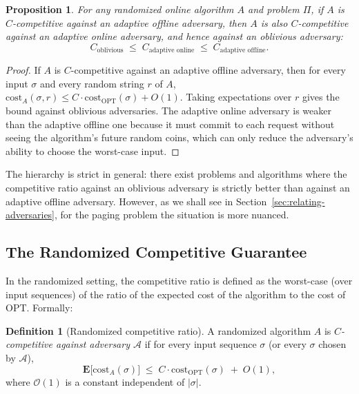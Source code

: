 \documentclass[twoside,12pt]{book}
\theoremstyle{plain}
\newtheorem{proposition}[theorem]{Proposition}
\theoremstyle{definition}
\newtheorem{definition}[theorem]{Definition}
\theoremstyle{remark}
\begin{document}
\begin{proposition}\label{prop:adversary-hierarchy}
For any randomized online algorithm $A$ and problem $\Pi$, if $A$ is
$C$-competitive against an adaptive offline adversary, then $A$ is also
$C$-competitive against an adaptive online adversary, and hence against an
oblivious adversary:
\[
  C_{\text{oblivious}} \;\le\; C_{\text{adaptive online}} \;\le\; C_{\text{adaptive offline}}.
\]
\end{proposition}

\begin{proof}
If $A$ is $C$-competitive against an adaptive offline adversary, then for
every input $\sigma$ and every random string $r$ of $A$,
$\mathrm{cost}_A(\sigma, r) \le C \cdot \mathrm{cost}_{\mathrm{OPT}}(\sigma) + O(1)$.
Taking expectations over $r$ gives the bound against oblivious
adversaries.  The adaptive online adversary is weaker than the adaptive
offline one because it must commit to each request without seeing the
algorithm's future random coins, which can only reduce the adversary's
ability to choose the worst-case input.
\end{proof}

The hierarchy is strict in general: there exist problems and algorithms
where the competitive ratio against an oblivious adversary is strictly
better than against an adaptive offline adversary.  However, as we shall
see in Section~\ref{sec:relating-adversaries}, for the paging problem the
situation is more nuanced.

\subsection{The Randomized Competitive Guarantee}

In the randomized setting, the competitive ratio is defined as the
worst-case (over input sequences) of the ratio of the expected cost of
the algorithm to the cost of OPT.  Formally:

\begin{definition}[Randomized competitive ratio]\label{def:rand-competitive}
A randomized algorithm $A$ is \emph{$C$-competitive against adversary
$\mathcal{A}$} if for every input sequence $\sigma$ (or every
$\sigma$ chosen by $\mathcal{A}$),
\[
  \mathbf{E}\!\bigl[\mathrm{cost}_A(\sigma)\bigr] \;\le\; C \cdot \mathrm{cost}_{\mathrm{OPT}}(\sigma) \;+\; O(1),
\]
where $\mathcal{O}(1)$ is a constant independent of $|\sigma|$.
\end{definition}
\end{document}
